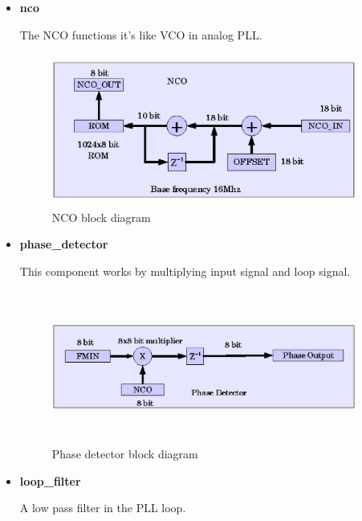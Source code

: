 \documentclass[a4paper,10pt]{article}
\begin{document}
\begin{itemize}

\item \textbf{nco}

The NCO functions it's like VCO in analog PLL. 


\begin{figure}[H]
\center
\includegraphics[width=10.0cm,height=5.0cm]{nco.eps}
\caption {NCO block diagram}
\end{figure}

\item \textbf{phase\_detector}

This component works by multiplying input signal
and loop signal.

\begin{figure}[H]
\center
\includegraphics[width=10.0cm,height=5.0cm]{phase_detector.eps}
\caption {Phase detector block diagram}
\end{figure}

\item \textbf{loop\_filter}

A low pass filter in the PLL loop.



\end{itemize}
\end{document}
